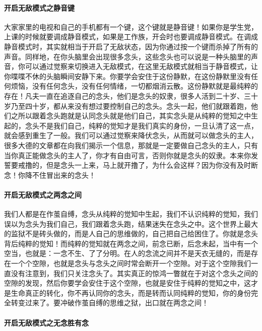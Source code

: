 \paragraph{开启无敌模式之静音键}

大家家里的电视和自己的手机都有一个键，这个键就是静音键！如果你是学生党，上课的时候就要调成静音模式，如果是工作族，开会时也要调成静音模式。在调成静音模式时，其实就相当于开启了无敌状态，因为你通过按一个键而杀掉了所有的声音。同样地，在你头脑里会出现很多念头，这些念头也可以说是一种头脑里的声音，你可以通过觉察来切换进入无敌模式，在这里无敌模式就相当于静音模式，让你喋喋不休的头脑瞬间安静下来。你要学会安住于这份静默，在这份静默里没有任何烦恼，没有任何念头，没有任何情绪，一切都烟消云散。这份静默就是最纯粹的存在！凡夫一直在追逐自己的念头，他们是念头的奴隶，很多人活到二十岁、三十岁乃至四十岁，都从来没有想过要控制自己的念头。念头一起，他们就跟着跑，他们之所以跟着念头跑就是认同念头就是他们自己，其实念头是从纯粹的觉知之中生起的，念头不是我们自己，纯粹的觉知才是我们真实的身份，一旦认清了这一点，就会感到重生了一般。我们可以通过觉察来降伏念头，从而就可以做念头的主人，很多大德的文章都在向我们揭示一个信息，那就是一定要做自己念头的主人，只有当你真正能做念头的主人了，你才有自由可言，否则你就是念头的奴隶。本来你发誓要戒撸的，但是念头一上来，马上就开撸了，为什么会这样？因为你没有及时断念！你降不住冒出来的念头！

\paragraph{开启无敌模式之两念之间}

我们人都是在作茧自缚，念头从纯粹的觉知中生起，我们不认识纯粹的觉知，我们误以为念头为我们自己，我们跟着念头跑，结果迷失在念头之中。这个世界上最大的监狱不是砖头做的，而是人自己的思维做的，自己把自己给困住了。你就是念头背后纯粹的觉知！而纯粹的觉知就在两念之间，前念已断，后念未起，当中有一个空当，也就是：一念不生、了了分明。在人的念流之间并不是天衣无缝的，而是存在一个个空隙，也就是念头与念头之间时常会断开一个空隙。对于这个空隙我们一直没有注意到，我们只关注念头了。其实真正的惊鸿一瞥就在于对这个念头之间的空隙的发现，然后你要学会安住于这个空隙，也就是安住于纯粹的觉知之中，这才是生命真正的转化，你不再认同你的念头，而是转而认同纯粹的觉知，你的身份完全转变过来了。要冲破作茧自缚的思维之狱，出口就在两念之间！

\paragraph{开启无敌模式之无念胜有念}

